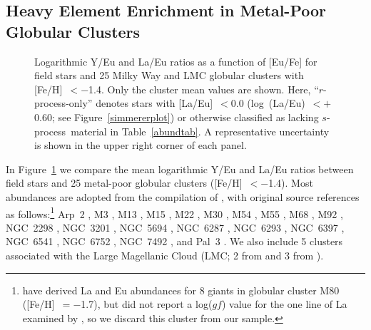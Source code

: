 \documentclass{emulateapj}
\def\rpro{\mbox{$r$-process}}
\def\spro{\mbox{$s$-process}}
\begin{document}
\subsection{Heavy Element Enrichment in Metal-Poor Globular Clusters}
\label{gc}


\begin{figure}
\begin{center}
\end{center}
\caption{
\label{gcplot}
Logarithmic Y/Eu and La/Eu ratios as a function of [Eu/Fe] for 
field stars and 25 Milky Way and LMC
globular clusters with [Fe/H]~$< -$1.4.
Only the cluster mean values are shown.
Here, ``\rpro-only'' denotes stars with 
[La/Eu]~$< 0.0$ (log~(La/Eu)~$< +$0.60; see Figure~\ref{simmererplot})
or otherwise classified as lacking
\spro\ material in Table~\ref{abundtab}.
A representative uncertainty is shown 
in the upper right corner of each panel.
}
\end{figure}

In Figure~\ref{gcplot} we compare the mean logarithmic Y/Eu and La/Eu 
ratios between field stars and 25 metal-poor globular clusters 
([Fe/H]~$< -$1.4).
Most abundances are adopted from the compilation of \citet{pritzl05},
with original source references as follows:\footnote{
\citet{cavallo04} have derived La and Eu abundances for 8 giants in
globular cluster M80 ([Fe/H]~$= -$1.7), but \citet{lawler01} did
not report a log($gf$) value for the one line of La examined by 
\citet{cavallo04}, so we discard this cluster from our sample.}
Arp~2 \citep{mottini08},
M3 \citep{cohen05a},
M13 \citep{cohen05a},
M15 \citep{sobeck10},
M22 \citep{brown92,marino09},
M30 \citep{shetrone03},
M54 \citep{brown99},
M55 \citep{shetrone03},
M68 \citep{shetrone03},
M92 \citep{shetrone01},
NGC~2298 \citep{mcwilliam92},
NGC~3201 \citep{gonzalez98},
NGC~5694 \citep{lee06},
NGC~6287 \citep{lee02},
NGC~6293 \citep{lee02},
NGC~6397 \citep{norris95},
NGC~6541 \citep{lee02},
NGC~6752 \citep{yong05},
NGC~7492 \citep{cohen05b}, and
Pal~3 \citep{koch09}.
We also include 
5 clusters associated with the Large Magellanic Cloud (LMC;
2 from \citealt{johnson06} and 3 from \citealt{mucciarelli10}).
\end{document}
